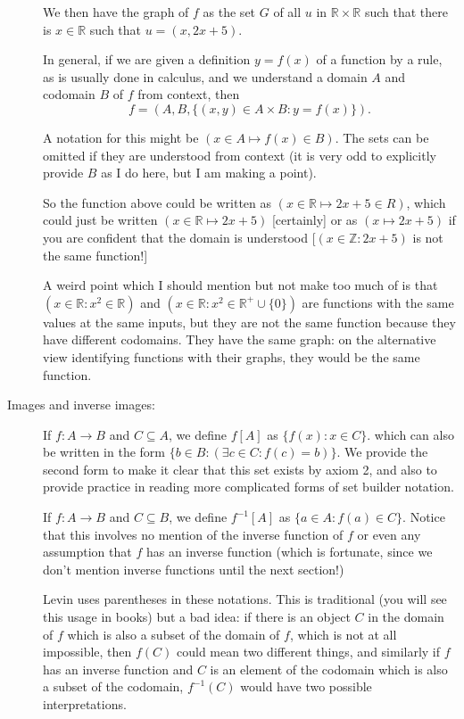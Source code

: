 \documentclass[12pt]{article}
\begin{document}
\begin{description}
We then have the graph of $f$ as the set $G$ of all $u$ in $\mathbb R \times \mathbb R$ such that there is $x \in \mathbb R$ such that $u = (x,2x+5)$.

In general, if we are given a definition $y = f(x)$ of a function by a rule, as is usually done in calculus, and we understand a domain $A$ and codomain $B$ of $f$ from context,
then $$f=(A,B,\{(x,y) \in A \times B:y=f(x)\}).$$

A notation for this might be $(x\in A \mapsto f(x)\in B)$.  The sets can be omitted if they are understood from context (it is very odd to explicitly provide $B$ as I do here, but I am making a point).

So the function above could be written as $(x \in \mathbb R \mapsto 2x+5 \in R)$, which could just be written $(x \in \mathbb R \mapsto 2x+5)$ [certainly] or as
$(x \mapsto 2x+5)$ if you are confident that the domain is understood [$(x \in \mathbb Z:2x+5)$ is not the same function!]

A weird point which I should mention but not make too much of is that $(x \in {\mathbb R}:x^2 \in \mathbb R)$ and $(x \in {\mathbb R}:x^2 \in \mathbb R^+ \cup \{0\})$ are functions with the same values at the same inputs, but they are not the same function because they have different codomains.  They have the same graph:  on the alternative view identifying functions with their graphs, they would be the same function.


\item[Images and inverse images:]

If $f:A \rightarrow B$ and $C \subseteq A$, we define $f[A]$ as $\{f(x):x \in C\}$. which can also be written in the form $\{b \in B:(\exists c \in C:f(c)=b)\}$.  We provide the second form to make it clear
that this set exists by axiom 2, and also to provide practice in reading more complicated forms of set builder notation.

If $f:A \rightarrow B$ and $C \subseteq B$, we define $f^{-1}[A]$ as $\{a \in A:f(a) \in C\}$.  Notice that this involves no mention of the inverse function of $f$ or even any assumption that $f$ has an inverse function (which is fortunate, since we don't mention inverse functions until the next section!)

Levin uses parentheses in these notations.  This is traditional (you will see this usage in books) but a bad idea:  if there is an object $C$ in the domain of $f$ which is also a subset of the domain of $f$, which is not at all impossible,
then $f(C)$ could mean two different things, and similarly if $f$ has an inverse function and $C$ is an element of the codomain which is also a subset of the codomain, $f^{-1}(C)$ would have two possible interpretations.


\end{description}
\end{document}
